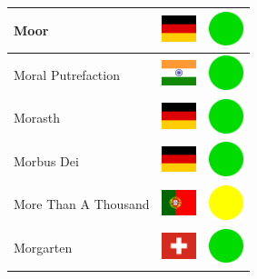 \documentclass[12pt, a4paper, twoside]{report}
\begin{document}
\begin{center}
\begin{longtable}{|p{5cm}|p{2cm}|p{2cm}|}
 Moor                                                       & \includegraphics[width=1cm]{../img/flags/de} &   \includegraphics[width=1cm]{../likes/y} \\ \hline
 Moral Putrefaction                                         & \includegraphics[width=1cm]{../img/flags/in} &   \includegraphics[width=1cm]{../likes/y} \\ \hline
 Morasth                                                    & \includegraphics[width=1cm]{../img/flags/de} &   \includegraphics[width=1cm]{../likes/y} \\ \hline
 Morbus Dei                                                 & \includegraphics[width=1cm]{../img/flags/de} &   \includegraphics[width=1cm]{../likes/y} \\ \hline
 More Than A Thousand                                       & \includegraphics[width=1cm]{../img/flags/pt} &   \includegraphics[width=1cm]{../likes/m} \\ \hline
 Morgarten                                                  & \includegraphics[width=1cm]{../img/flags/ch} &   \includegraphics[width=1cm]{../likes/y} \\ \hline

\end{longtable}
\end{center}
\end{document}
